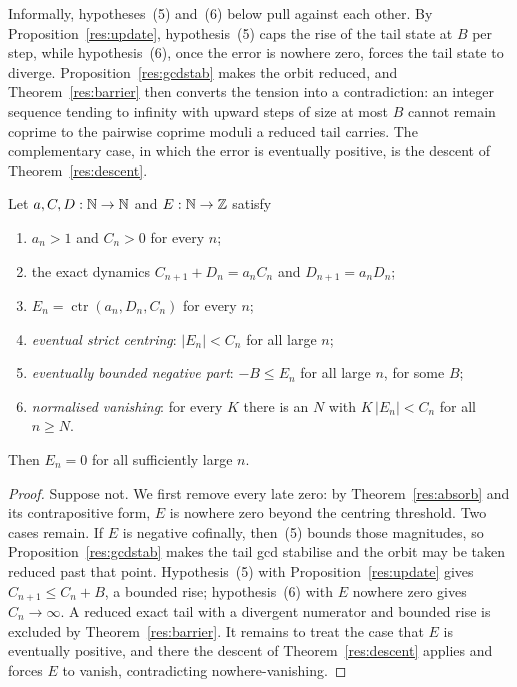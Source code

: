 \documentclass[11pt]{article}
\newcommand{\ctr}{\operatorname{ctr}}
\begin{document}
Informally, hypotheses~(5) and~(6) below pull against each other.  By
Proposition~\ref{res:update}, hypothesis~(5) caps the rise of the tail state at
$B$ per step, while hypothesis~(6), once the error is nowhere zero, forces the
tail state to diverge.  Proposition~\ref{res:gcdstab} makes the orbit reduced,
and Theorem~\ref{res:barrier} then converts the tension into a contradiction:
an integer sequence tending to infinity with upward steps of size at most $B$
cannot remain coprime to the pairwise coprime moduli a reduced tail carries.
The
complementary case, in which the error is eventually positive, is the descent
of Theorem~\ref{res:descent}.

\begin{theorem}\label{res:bounded}
Let $a,C,D:\mathbb{N}\to\mathbb{N}$ and $E:\mathbb{N}\to\mathbb{Z}$ satisfy
\begin{enumerate}
\item $a_n>1$ and $C_n>0$ for every $n$;
\item the exact dynamics $C_{n+1}+D_n=a_nC_n$ and $D_{n+1}=a_nD_n$;
\item $E_n=\ctr(a_n,D_n,C_n)$ for every $n$;
\item \emph{eventual strict centring}: $|E_n|<C_n$ for all large $n$;
\item \emph{eventually bounded negative part}: $-B\le E_n$ for all large $n$,
for some $B$;
\item \emph{normalised vanishing}: for every $K$ there is an $N$ with
$K\,|E_n|<C_n$ for all $n\ge N$.
\end{enumerate}
Then $E_n=0$ for all sufficiently large $n$.
\end{theorem}

\begin{proof}
Suppose not.  We first remove every late zero: by Theorem~\ref{res:absorb} and
its contrapositive form, $E$ is nowhere zero beyond the centring threshold.
Two cases remain.  If $E$ is negative cofinally,
then~(5) bounds those magnitudes, so Proposition~\ref{res:gcdstab} makes the
tail gcd stabilise and the orbit may be taken reduced past that point.
Hypothesis~(5) with
Proposition~\ref{res:update} gives $C_{n+1}\le C_n+B$, a bounded rise;
hypothesis~(6) with $E$ nowhere zero gives $C_n\to\infty$.  A reduced exact
tail with a divergent numerator and bounded rise is excluded by
Theorem~\ref{res:barrier}.  It remains to treat the case that $E$ is eventually
positive, and there the descent
of Theorem~\ref{res:descent} applies and forces $E$ to vanish, contradicting
nowhere-vanishing.
\end{proof}
\end{document}
